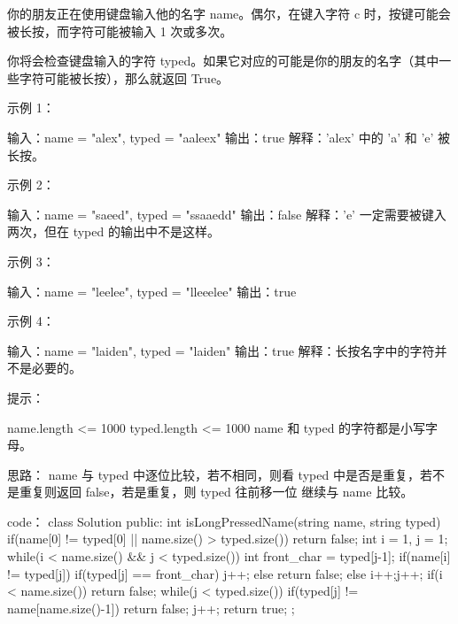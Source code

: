 你的朋友正在使用键盘输入他的名字 name。偶尔，在键入字符 c 时，按键可能会被长按，而字符可能被输入 1 次或多次。

你将会检查键盘输入的字符 typed。如果它对应的可能是你的朋友的名字（其中一些字符可能被长按），那么就返回 True。

 

示例 1：

输入：name = "alex", typed = "aaleex"
输出：true
解释：'alex' 中的 'a' 和 'e' 被长按。

示例 2：

输入：name = "saeed", typed = "ssaaedd"
输出：false
解释：'e' 一定需要被键入两次，但在 typed 的输出中不是这样。

示例 3：

输入：name = "leelee", typed = "lleeelee"
输出：true

示例 4：

输入：name = "laiden", typed = "laiden"
输出：true
解释：长按名字中的字符并不是必要的。

 

提示：

    name.length <= 1000
    typed.length <= 1000
    name 和 typed 的字符都是小写字母。

















思路：
name 与 typed 中逐位比较，若不相同，则看 typed 中是否是重复，若不是重复则返回 false，若是重复，则 typed 往前移一位 继续与 name 比较。



















code：
class Solution {
public:
    int isLongPressedName(string name, string typed) {
        if(name[0] != typed[0] || name.size() > typed.size()) return false;
        int i = 1, j = 1;
        while(i < name.size() && j < typed.size())
        {
            int front_char = typed[j-1];
            if(name[i] != typed[j])
            {
                if(typed[j] == front_char) j++;
                else return false;
            }
            else
            {
                i++;j++;
            }
        }
        if(i < name.size()) return false;
        while(j < typed.size())
        {
            if(typed[j] != name[name.size()-1]) return false;
            j++;
        }
        return true;
    }
};